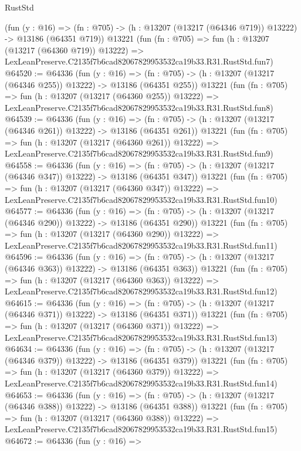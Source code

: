 \begin{lexlean}{RustStd}
\begin{coremodule}
    (fun (y : @16) =>
    (fn : @705) -> (h : @13207 (@13217 (@64346 @719)) @13222) -> @13186 (@64351 @719))
    @13221
    (fun (fn : @705) =>
    fun (h : @13207 (@13217 (@64360 @719)) @13222) =>
    LexLeanPreserve.C2135f7b6cad82067829953532ca19b33.R31.RustStd.fun7)
@64520 := @64336
    (fun (y : @16) =>
    (fn : @705) -> (h : @13207 (@13217 (@64346 @255)) @13222) -> @13186 (@64351 @255))
    @13221
    (fun (fn : @705) =>
    fun (h : @13207 (@13217 (@64360 @255)) @13222) =>
    LexLeanPreserve.C2135f7b6cad82067829953532ca19b33.R31.RustStd.fun8)
@64539 := @64336
    (fun (y : @16) =>
    (fn : @705) -> (h : @13207 (@13217 (@64346 @261)) @13222) -> @13186 (@64351 @261))
    @13221
    (fun (fn : @705) =>
    fun (h : @13207 (@13217 (@64360 @261)) @13222) =>
    LexLeanPreserve.C2135f7b6cad82067829953532ca19b33.R31.RustStd.fun9)
@64558 := @64336
    (fun (y : @16) =>
    (fn : @705) -> (h : @13207 (@13217 (@64346 @347)) @13222) -> @13186 (@64351 @347))
    @13221
    (fun (fn : @705) =>
    fun (h : @13207 (@13217 (@64360 @347)) @13222) =>
    LexLeanPreserve.C2135f7b6cad82067829953532ca19b33.R31.RustStd.fun10)
@64577 := @64336
    (fun (y : @16) =>
    (fn : @705) -> (h : @13207 (@13217 (@64346 @290)) @13222) -> @13186 (@64351 @290))
    @13221
    (fun (fn : @705) =>
    fun (h : @13207 (@13217 (@64360 @290)) @13222) =>
    LexLeanPreserve.C2135f7b6cad82067829953532ca19b33.R31.RustStd.fun11)
@64596 := @64336
    (fun (y : @16) =>
    (fn : @705) -> (h : @13207 (@13217 (@64346 @363)) @13222) -> @13186 (@64351 @363))
    @13221
    (fun (fn : @705) =>
    fun (h : @13207 (@13217 (@64360 @363)) @13222) =>
    LexLeanPreserve.C2135f7b6cad82067829953532ca19b33.R31.RustStd.fun12)
@64615 := @64336
    (fun (y : @16) =>
    (fn : @705) -> (h : @13207 (@13217 (@64346 @371)) @13222) -> @13186 (@64351 @371))
    @13221
    (fun (fn : @705) =>
    fun (h : @13207 (@13217 (@64360 @371)) @13222) =>
    LexLeanPreserve.C2135f7b6cad82067829953532ca19b33.R31.RustStd.fun13)
@64634 := @64336
    (fun (y : @16) =>
    (fn : @705) -> (h : @13207 (@13217 (@64346 @379)) @13222) -> @13186 (@64351 @379))
    @13221
    (fun (fn : @705) =>
    fun (h : @13207 (@13217 (@64360 @379)) @13222) =>
    LexLeanPreserve.C2135f7b6cad82067829953532ca19b33.R31.RustStd.fun14)
@64653 := @64336
    (fun (y : @16) =>
    (fn : @705) -> (h : @13207 (@13217 (@64346 @388)) @13222) -> @13186 (@64351 @388))
    @13221
    (fun (fn : @705) =>
    fun (h : @13207 (@13217 (@64360 @388)) @13222) =>
    LexLeanPreserve.C2135f7b6cad82067829953532ca19b33.R31.RustStd.fun15)
@64672 := @64336
    (fun (y : @16) =>

\end{coremodule}
\end{lexlean}
